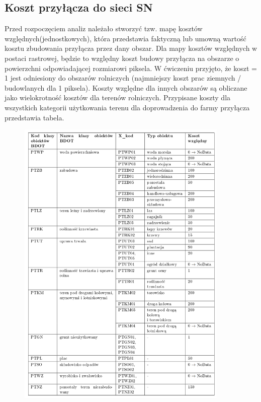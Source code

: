\documentclass{article}
\begin{document}
\subsection{Koszt przyłącza do sieci SN}
Przed rozpoczęciem analiz należało stworzyć tzw. mapę kosztów względnych(jednostkowych), która przedstawia faktyczną lub umowną wartość kosztu zbudowania
przyłącza przez dany obszar. Dla mapy kosztów względnych w postaci rastrowej, będzie to względny koszt budowy przyłącza na obszarze o powierzchni odpowiadającej rozmiarowi
piksela. W ćwiczeniu przyjęto, że koszt = 1 jest odniesiony do obszarów rolniczych (najmniejszy koszt prac ziemnych / budowlanych dla 1 piksela). Koszty względne dla innych obszarów są obliczane jako wielokrotność kosztów dla terenów rolniczych. Przypisane koszty dla wszystkich kategorii użytkowania terenu dla doprowadzenia do
farmy przyłącza przedstawia tabela.

\begin{figure}[H]
    \centering
    \includegraphics[width=0.9\textwidth]{img/tabela_kosztow_wzglednych.png}
    \caption*{}
\end{figure}
\end{document}
